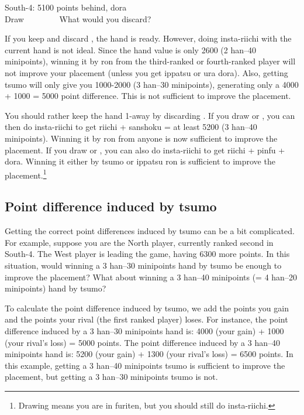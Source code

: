\bigskip
\begin{itembox}[r]{South-4: 5100 points behind, {\jap dora} {\Large{}}}
\bp
{}~~\\
\hfill\footnotesize{Draw~~~~~~~~}
\ep
\vspace{-17pt}
What would you discard?
\end{itembox}

\bigskip
If you keep {\LARGE{}} and discard {\LARGE{}}, the hand is ready. However, doing insta-riichi with the current hand is not ideal. Since the hand value is only 2600 (2 {\jap han}--40 minipoints), winning it by {\jap ron} from the third-ranked or fourth-ranked player will not improve your placement (unless you get {\jap ippatsu} or {\jap ura dora}). Also, getting {\jap tsumo} will only give you 1000-2000 (3 {\jap han}--30 minipoints), generating only a 4000 + 1000 = 5000 point difference. This is not sufficient to improve the placement. 

\bigskip
You should rather keep the hand 1-away by discarding {\LARGE{}}. If you draw {\LARGE{}} or {\LARGE{}}, you can then do insta-riichi to get riichi + {\jap sanshoku} = at least 5200 (3 {\jap han}--40 minipoints). Winning it by {\jap ron} from anyone is now sufficient to improve the placement. If you draw {\LARGE{}} or {\LARGE{}}, you can also do insta-riichi to get riichi + {\jap pinfu} + {\jap dora}. Winning it either by {\jap tsumo} or {\jap ippatsu ron} is sufficient to improve the placement.\footnote{Drawing  means you are in {\jap furiten}, but you should still do insta-riichi.}

\bigskip
\subsection*{Point difference induced by {\jap tsumo}}
Getting the correct point differences induced by {\jap tsumo} can be a bit complicated. For example, suppose you are the North player, currently ranked second in South-4. The West player is leading the game, having 6300 more points. In this situation, would winning a 3 {\jap han}--30 minipoints hand by {\jap tsumo} be enough to improve the placement? What about winning a 3 {\jap han}--40 minipoints (= 4 {\jap han}--20 minipoints) hand by {\jap tsumo}? 

\bigskip
To calculate the point difference induced by {\jap tsumo}, we add the points you gain and the points your rival (the first ranked player) loses. For instance, the point difference induced by a 3 {\jap han}--30 minipoints hand is: 4000 (your gain) + 1000 (your rival's loss) = 5000 points. The point difference induced by a 3 {\jap han}--40 minipoints hand is: 5200 (your gain) + 1300 (your rival's loss) = 6500 points. 
In this example, getting a 3 {\jap han}--40 minipoints {\jap tsumo} is sufficient to improve the placement, but getting a 3 {\jap han}--30 minipoints {\jap tsumo} is not. 

